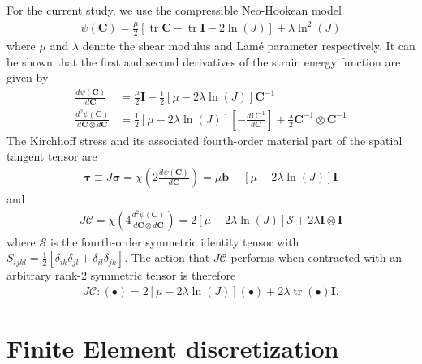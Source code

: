 \documentclass[times,doublespace]{nmeauth}
\DeclareMathOperator{\trace}{tr}
\begin{document}
For the current study, we use the compressible Neo-Hookean model
\begin{gather}
\psi \left( \mathbf{C} \right)
  = \frac{\mu}{2} \left[ \trace{\mathbf{C}} - \trace{\mathbf{I}} - 2 \ln\left( J \right) \right]
  + \lambda \ln^{2}\left( J \right)
\end{gather}
where $\mu$ and $\lambda$ denote the shear modulus and Lam\'{e} parameter respectively. It can be shown that the first and second derivatives of the strain energy function are given by
\begin{align}
\frac{d \psi \left( \mathbf{C} \right)}{d \mathbf{C}}
  &= \frac{\mu}{2} \mathbf{I} - \frac{1}{2} \left[ \mu - 2\lambda\ln\left( J \right) \right] \mathbf{C}^{-1} \\
\frac{d^{2} \psi \left( \mathbf{C} \right)}{d \mathbf{C} \otimes d \mathbf{C}}
  &= \frac{1}{2}\left[ \mu - 2\lambda\ln\left( J \right) \right] \left[ - \frac{d \mathbf{C}^{-1}}{d \mathbf{C}} \right]
  + \frac{\lambda}{2} \mathbf{C}^{-1} \otimes \mathbf{C}^{-1}
\end{align}
The Kirchhoff stress and its associated fourth-order material part of the spatial tangent tensor are
\begin{gather}
\boldsymbol{\tau}
  \equiv J \boldsymbol{\sigma}
  = \chi\left( 2 \frac{d \psi \left( \mathbf{C} \right)}{d \mathbf{C}} \right)
  = \mu \mathbf{b} - \left[ \mu - 2\lambda\ln\left( J \right) \right] \mathbf{I}
\end{gather}
and
\begin{gather}
J \boldsymbol{\mathcal{C}}
  = \chi\left( 4 \frac{d^{2} \psi \left( \mathbf{C} \right)}{d \mathbf{C} \otimes d \mathbf{C}} \right)
  = 2 \left[ \mu - 2\lambda\ln\left( J \right) \right] \boldsymbol{\mathcal{S}}
  + 2 \lambda \mathbf{I} \otimes \mathbf{I}
\end{gather}
where $\boldsymbol{\mathcal{S}}$ is the fourth-order symmetric identity tensor
with $S_{ijkl}=\frac{1}{2}\left[\delta_{ik}\delta_{jl}+\delta_{il}\delta_{jk}\right]$.
The action that $J \boldsymbol{\mathcal{C}}$ performs when contracted with an arbitrary rank-2 symmetric tensor is therefore
\begin{gather}
J \boldsymbol{\mathcal{C}} : \left( \bullet \right)
  = 2 \left[ \mu - 2\lambda\ln\left( J \right) \right] \left( \bullet \right)
  + 2 \lambda \trace\left( \bullet \right) \mathbf{I}.
\label{eq:simplified_action}
\end{gather}

\section{Finite Element discretization}
\label{sec:fe}
\end{document}
